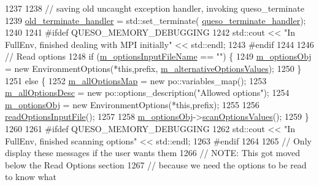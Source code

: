 \begin{DoxyCode}
1237 
1238   \textcolor{comment}{// saving old uncaught exception handler, invoking queso\_terminate}
1239   \hyperlink{namespace_q_u_e_s_o_ac54b755ffb94b8896563c43fec9a6a4c}{old\_terminate\_handler} = std::set\_terminate(
      \hyperlink{namespace_q_u_e_s_o_a97e263e01a0ff9fad14de6a8840b007e}{queso\_terminate\_handler});
1240 
1241 \textcolor{preprocessor}{#ifdef QUESO\_MEMORY\_DEBUGGING}
1242 \textcolor{preprocessor}{}  std::cout << \textcolor{stringliteral}{"In FullEnv, finished dealing with MPI initially"} << std::endl;
1243 \textcolor{preprocessor}{#endif}
1244 \textcolor{preprocessor}{}
1246   \textcolor{comment}{// Read options}
1248 \textcolor{comment}{}  \textcolor{keywordflow}{if} (\hyperlink{class_q_u_e_s_o_1_1_base_environment_a37195909442a817980e1cf8392b9e63d}{m\_optionsInputFileName} == \textcolor{stringliteral}{""}) \{
1249     \hyperlink{class_q_u_e_s_o_1_1_base_environment_aa91c7ac0ab11472bafb0ae4ac36d2194}{m\_optionsObj} = \textcolor{keyword}{new} EnvironmentOptions(*\textcolor{keyword}{this},prefix,
      \hyperlink{class_q_u_e_s_o_1_1_base_environment_a38f945c0c2e4d90a550b06a341cc2c7d}{m\_alternativeOptionsValues});
1250   \}
1251   \textcolor{keywordflow}{else} \{
1252     \hyperlink{class_q_u_e_s_o_1_1_base_environment_a2d8e668313b18f57e4607c3bec1ecda2}{m\_allOptionsMap}  = \textcolor{keyword}{new} po::variables\_map();
1253     \hyperlink{class_q_u_e_s_o_1_1_base_environment_aac5465b02be108536bda1b5627456c97}{m\_allOptionsDesc} = \textcolor{keyword}{new} po::options\_description(\textcolor{stringliteral}{"Allowed options"});
1254     \hyperlink{class_q_u_e_s_o_1_1_base_environment_aa91c7ac0ab11472bafb0ae4ac36d2194}{m\_optionsObj} = \textcolor{keyword}{new} EnvironmentOptions(*\textcolor{keyword}{this},prefix);
1255 
1256     \hyperlink{class_q_u_e_s_o_1_1_full_environment_a41eadd931012db5a422f5ec13adb7816}{readOptionsInputFile}();
1257 
1258     \hyperlink{class_q_u_e_s_o_1_1_base_environment_aa91c7ac0ab11472bafb0ae4ac36d2194}{m\_optionsObj}->\hyperlink{class_q_u_e_s_o_1_1_environment_options_a0748c6bd893d2ac90cd68d50b5abe211}{scanOptionsValues}();
1259   \}
1260 
1261 \textcolor{preprocessor}{#ifdef QUESO\_MEMORY\_DEBUGGING}
1262 \textcolor{preprocessor}{}  std::cout << \textcolor{stringliteral}{"In FullEnv, finished scanning options"} << std::endl;
1263 \textcolor{preprocessor}{#endif}
1264 \textcolor{preprocessor}{}
1265   \textcolor{comment}{// Only display these messages if the user wants them}
1266   \textcolor{comment}{// NOTE: This got moved below the Read Options section}
1267   \textcolor{comment}{// because we need the options to be read to know what}

\end{DoxyCode}

